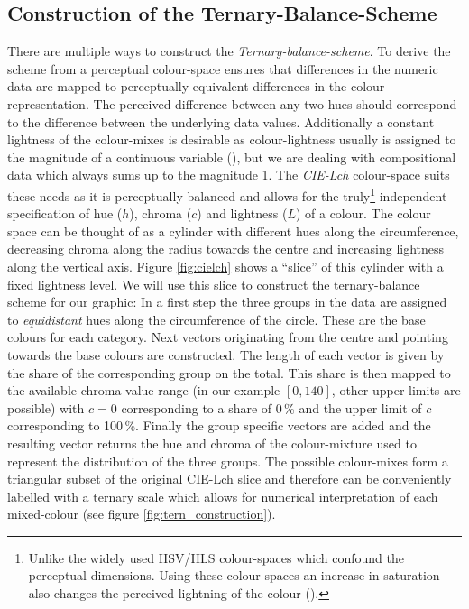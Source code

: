 \documentclass[a4paper, 12pt]{scrartcl}
\begin{document}
\begin{appendix}

\section{Construction of the Ternary-Balance-Scheme} %
\label{sec:app-tbs}

There are multiple ways to construct the \emph{Ternary-balance-scheme}. To derive the scheme from a perceptual colour-space ensures that differences in the numeric data are mapped to perceptually equivalent differences in the colour representation. The perceived difference between any two hues should correspond to the difference between the underlying data values. Additionally a constant lightness of the colour-mixes is desirable as colour-lightness usually is assigned to the magnitude of a continuous variable (\cite{Brewer1994}), but we are dealing with compositional data which always sums up to the magnitude 1. The \emph{CIE-Lch} colour-space suits these needs as it is perceptually balanced and allows for the truly\footnote{Unlike the widely used HSV/HLS colour-spaces which confound the perceptual dimensions. Using these colour-spaces an increase in saturation also changes the perceived lightning of the colour (\cite{Brewer1999}).} independent specification of hue ($h$), chroma ($c$) and lightness ($L$) of a colour. The colour space can be thought of as a cylinder with different hues along the circumference, decreasing chroma along the radius towards the centre and increasing lightness along the vertical axis. Figure \ref{fig:cielch} shows a \enquote{slice} of this cylinder with a fixed lightness level. We will use this slice to construct the ternary-balance scheme for our graphic: In a first step the three groups in the data are assigned to \emph{equidistant} hues along the circumference of the circle. These are the base colours for each category. Next vectors originating from the centre and pointing towards the base colours are constructed. The length of each vector is given by the share of the corresponding group on the total. This share is then mapped to the available chroma value range (in our example $[0,140]$, other upper limits are possible) with $c = 0$ corresponding to a share of 0\,\% and the upper limit of $c$ corresponding to 100\,\%. Finally the group specific vectors are added and the resulting vector returns the hue and chroma of the colour-mixture used to represent the distribution of the three groups. The possible colour-mixes form a triangular subset of the original CIE-Lch slice and therefore can be conveniently labelled with a ternary scale which allows for numerical interpretation of each mixed-colour (see figure \ref{fig:tern_construction}).


\end{appendix}
\end{document}
